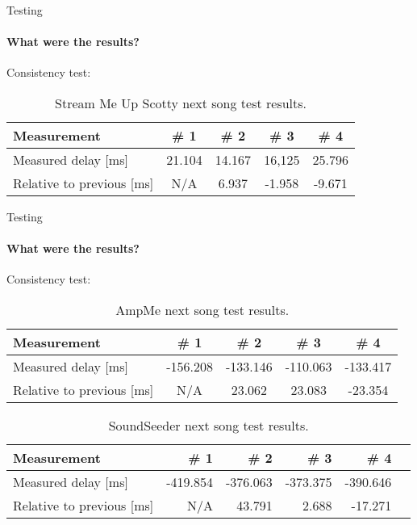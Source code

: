         \begin{frame}{Testing}\framesubtitle{What were the results?}
            Consistency test:\bigskip
            \begin{table}[ht]
                \centering
                \scriptsize
                \begin{tabularx}{0.97\textwidth}{Xcccc}
                    \toprule
                    Measurement                 & \# 1      & \# 2      & \# 3     & \# 4     \\\midrule
                    Measured delay [ms]         & 21.104    & 14.167    & 16,125   & 25.796   \\
                    Relative to previous [ms]   & N/A       & 6.937     & -1.958   & -9.671   \\\bottomrule
                \end{tabularx}
                \caption{Stream Me Up Scotty next song test results.}\label{fig:smus_pause_resume}
            \end{table}
        \end{frame}
        \begin{frame}{Testing}\framesubtitle{What were the results?}
        Consistency test:\bigskip
            \begin{table}[ht]
                \centering
                \scriptsize
                \begin{tabularx}{0.97\textwidth}{Xcccc}
                    \toprule
                    Measurement                 & \# 1      & \# 2     & \# 3     & \# 4      \\ \midrule
                    Measured delay [ms]         & -156.208  & -133.146 & -110.063 & -133.417   \\
                    Relative to previous [ms]   & N/A       & 23.062   & 23.083   & -23.354   \\ \bottomrule
                \end{tabularx}
                \caption{AmpMe next song test results.}
                \label{fig:ampmenextsongfigure}
            \end{table}
            \begin{table}[ht]
                \centering
                \scriptsize
                \begin{tabularx}{0.97\textwidth}{Xrrrrr}
                    \toprule
                    Measurement                 & \# 1      & \# 2      & \# 3     & \# 4       \\ \midrule
                    Measured delay [ms]         & -419.854  & -376.063  & -373.375 & -390.646 \\
                    Relative to previous [ms]   & N/A       & 43.791    & 2.688  & -17.271  \\ \bottomrule
                \end{tabularx}
                \caption{SoundSeeder next song test results.}
                \label{fig:soundseedernextsongfigure}
            \end{table}
        \end{frame}
